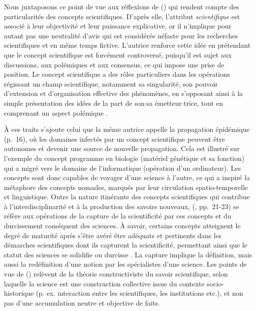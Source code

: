 Nous juxtaposons ce point de vue aux réflexions de \citeauthor{stengers1987d} (\citeyear{stengers1987d}) qui rendent compte des particularités des concepts scientifiques. D'après elle, l'attribut \textit{scientifique} est associé à leur objectivité et leur puissance explicative, or il n'implique pour autant pas une neutralité d'avis qui est considérée néfaste pour les recherches scientifiques et en même temps fictive. L'autrice renforce cette idée en prétendant que le concept scientifique est forcément controversé, puisqu'il est sujet aux discussions, aux polémiques et aux consensus, ce qui impose une prise de position. Le concept scientifique a des rôles particuliers dans les opérations régissant un champ scientifique, notamment sa singularité, son pouvoir d'extension et d'organisation effective des phénomènes, en s'opposant ainsi à la simple présentation des idées de la part de son$\cdot$sa émetteur$\cdot$trice, tout en comprenant un aspect polémique \citep[pp.~10-11]{stengers1987d}. 

À ces traits s'ajoute celui que la même autrice appelle \og{}la propagation épidémique\fg{} (p.~16), où les domaines \og{}infectés\fg{} par un concept scientifique peuvent être autonomes et devenir une source de nouvelle propagation. Cela est illustré sur l'exemple du concept \og programme \fg{} en biologie (matériel génétique et sa fonction) qui a migré vers le domaine de l'informatique (opération d'un ordinateur). Les concepts sont donc capables de voyager d'une science à l'autre, ce qui a inspiré la métaphore des \og{}concepts nomades\fg{}, marqués par leur circulation spatio-temporelle et linguistique. Outre la nature itinérante des concepts scientifiques qui contribue à l'interdisciplinarité et à la production des savoirs nouveaux, \citeauthor{stengers1987d} (\citeyear{stengers1987d}, pp.~21-23) se réfère aux opérations de la \og capture \fg{} de la scientificité par ces concepts et du \og durcissement \fg{} conséquent des sciences. À savoir, certains concepts atteignent le degré de maturité après s'être avéré être adéquats et pertinents dans les démarches scientifiques dont ils \og{}capturent\fg{} la scientificité, permettant ainsi que le statut des sciences se solidifie ou \og durcisse \fg{}. La capture implique la définition, mais aussi la redéfinition d'une notion par les spécialistes d'une science. Les points de vue de \citeauthor{stengers1987d} (\citeyear{stengers1987d}) relèvent de la théorie constructiviste du savoir scientifique, selon laquelle la science est une \og{}construction\fg{} collective issue du contexte socio-historique (p. ex. interaction entre les scientifiques, les institutions etc.), et non pas d'une accumulation neutre et objective de faits.

